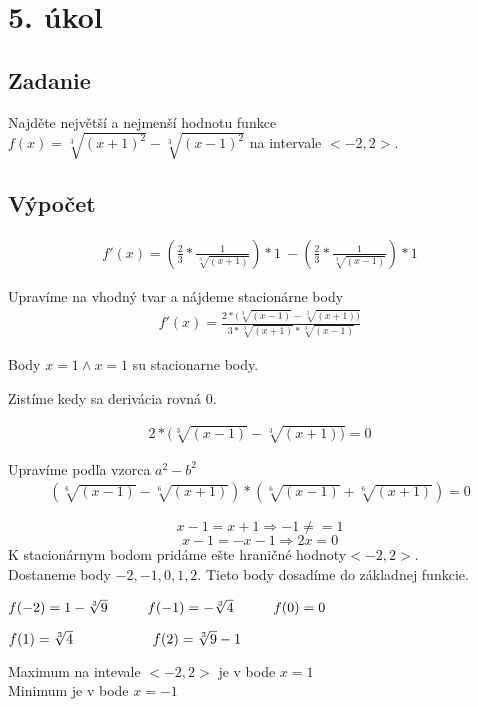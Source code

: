 \section{5. úkol}

\subsection{Zadanie}
 Najděte největší a nejmenší hodnotu funkce $f(x)=\sqrt[3]{(x+1)^2} -\sqrt[3]{(x-1)^2}$ na intervale $ <-2,2>$.
\subsection{Výpočet}
\begin{align*}
f'(x)=\left(\frac{2}{3}*\frac{1}{\sqrt[3]{(x+1)}}\right)*1\
-\left(\frac{2}{3}*\frac{1}{\sqrt[3]{(x-1)}}\right)*1
\end{align*}

Upravíme na vhodný tvar a nájdeme stacionárne body
\begin{align*}
f'(x)=\frac{2*(\sqrt[3]{(x-1)}-\sqrt[3]{(x+1))}}{3*\sqrt[3]{(x+1)}*\sqrt[3]{(x-1)}}
\end{align*}

\begin{center}
Body $x=1 \wedge  x=1$ su stacionarne body.
\end{center}

Zistíme kedy sa derivácia rovná 0. 

\begin{align*}
2*(\sqrt[3]{(x-1)}-\sqrt[3]{(x+1))}=0
\end{align*}

Upravíme podľa vzorca $ a^2-b^2$\\
\begin{align*}
\left(\sqrt[6]{(x-1)}-\sqrt[6]{(x+1)}\right)*\left(\sqrt[6]{(x-1)}+\sqrt[6]{(x+1)}\right)=0 
\end{align*}

$$x-1=x+1 \Rightarrow -1\neq=1$$
$$x-1=-x-1 \Rightarrow 2x=0$$
K stacionárnym bodom pridáme ešte hraničné hodnoty$ <-2,2>$.\\
Dostaneme body $-2,-1,0,1,2$. Tieto body dosadíme do základnej funkcie.
\begin{center}
$f(-2)=1-\sqrt[3]{9} \hspace{10mm} f(-1)=-\sqrt[3]{4} \hspace{10mm}  f(0)=0 $
\end{center}
\hspace{19mm} $f(1)=\sqrt[3]{4} \hspace{20mm} f(2)=\sqrt[3]{9}-1$

\begin{center}
\large{Maximum na intevale $ <-2,2>$ je v bode $x=1$ \\
 Minimum je v bode $x=-1$}
\end{center}
